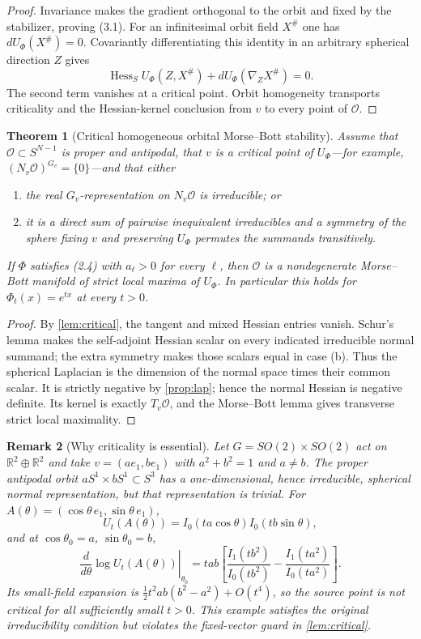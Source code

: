 \documentclass[11pt]{article}
\newtheorem{theorem}{Theorem}[section]
\newtheorem{remark}[theorem]{Remark}
\newcommand{\R}{\mathbb R}
\newcommand{\cO}{\mathcal O}
\begin{document}
\begin{proof}
Invariance makes the gradient orthogonal to the orbit and fixed by the
stabilizer, proving (3.1).  For an infinitesimal orbit field $X^\#$ one has
$dU_\Phi(X^\#)=0$.  Covariantly differentiating this identity in an arbitrary
spherical direction $Z$ gives
\[
 \operatorname{Hess}_S U_\Phi(Z,X^\#)
 +dU_\Phi(\nabla_ZX^\#)=0.
\]
The second term vanishes at a critical point.  Orbit homogeneity transports
criticality and the Hessian-kernel conclusion from $v$ to every point of
$\cO$.
\end{proof}

\begin{theorem}[Critical homogeneous orbital Morse--Bott stability]\label{thm:mb}
Assume that $\cO\subset S^{N-1}$ is proper and antipodal, that $v$ is a
critical point of $U_\Phi$---for example,
$(N_v\cO)^{G_v}=\{0\}$---and that either
\begin{enumerate}[label=(\alph*)]
\item the real $G_v$-representation on $N_v\cO$ is irreducible; or
\item it is a direct sum of pairwise inequivalent irreducibles and a symmetry
of the sphere fixing $v$ and preserving $U_{\Phi}$ permutes the summands
transitively.
\end{enumerate}
If $\Phi$ satisfies (2.4) with $a_\ell>0$ for every $\ell$, then
$\cO$ is a nondegenerate Morse--Bott manifold of strict local maxima of
$U_\Phi$.  In particular this holds for $\Phi_t(x)=e^{tx}$ at every $t>0$.
\end{theorem}

\begin{proof}
By \cref{lem:critical}, the tangent and mixed Hessian entries vanish.  Schur's
lemma makes the self-adjoint Hessian scalar on every indicated irreducible
normal summand; the extra symmetry makes those scalars equal in case (b).
Thus the spherical Laplacian is the dimension of the normal space times their
common scalar.  It is strictly negative by
\cref{prop:lap}; hence the normal Hessian is negative definite.  Its kernel
is exactly $T_v\cO$, and the Morse--Bott lemma gives transverse strict local
maximality.
\end{proof}

\begin{remark}[Why criticality is essential]\label{rem:torus}
Let $G=SO(2)\times SO(2)$ act on $\R^2\oplus\R^2$ and take
$v=(ae_1,be_1)$ with $a^2+b^2=1$ and $a\ne b$.  The proper antipodal orbit
$aS^1\times bS^1\subset S^3$ has a one-dimensional, hence irreducible,
spherical normal representation, but that representation is trivial.  For
$A(\theta)=(\cos\theta\,e_1,\sin\theta\,e_1)$,
\[
 U_t(A(\theta))=I_0(ta\cos\theta)I_0(tb\sin\theta),
\]
and at $\cos\theta_0=a$, $\sin\theta_0=b$,
\[
 \left.\frac d{d\theta}\log U_t(A(\theta))\right|_{\theta_0}
 =tab\!\left[\frac{I_1(tb^2)}{I_0(tb^2)}-
               \frac{I_1(ta^2)}{I_0(ta^2)}\right].          \tag{3.2}
\]
Its small-field expansion is
$\tfrac12t^2ab(b^2-a^2)+O(t^4)$, so the source point is not critical for all
sufficiently small $t>0$.  This example satisfies the original irreducibility
condition but violates the fixed-vector guard in \cref{lem:critical}.
\end{remark}
\end{document}
